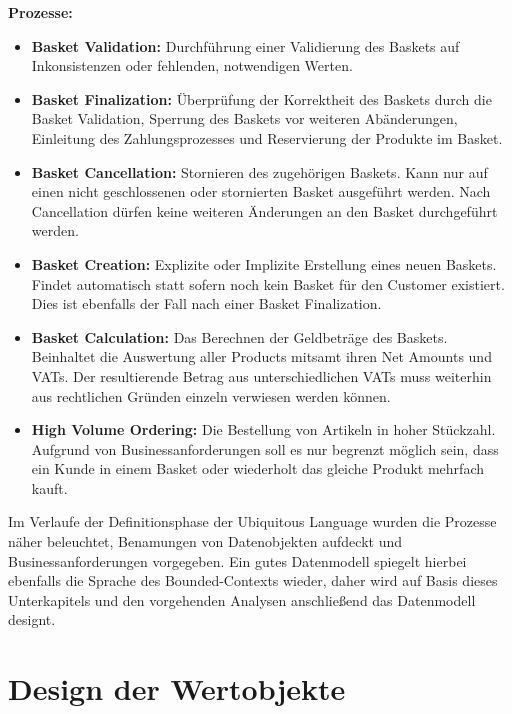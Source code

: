 {\large \textbf{Prozesse:}}
\begin{itemize}[noitemsep,nolistsep]
	\item \textbf{Basket Validation: } {Durchführung einer Validierung des Baskets auf Inkonsistenzen oder fehlenden, notwendigen Werten.}
	\item \textbf{Basket Finalization: } {Überprüfung der Korrektheit des Baskets durch die Basket Validation, Sperrung des Baskets vor weiteren Abänderungen, Einleitung des Zahlungsprozesses und Reservierung der Produkte im Basket. }
	\item \textbf{Basket Cancellation: } {Stornieren des zugehörigen Baskets. Kann nur auf einen nicht geschlossenen oder stornierten Basket ausgeführt werden. Nach Cancellation dürfen keine weiteren Änderungen an den Basket durchgeführt werden. }
	\item \textbf{Basket Creation: } {Explizite oder Implizite Erstellung eines neuen Baskets. Findet automatisch statt sofern noch kein Basket für den Customer existiert. Dies ist ebenfalls der Fall nach einer Basket Finalization.}
	\item \textbf{Basket Calculation: } {Das Berechnen der Geldbeträge des Baskets. Beinhaltet die Auswertung aller Products mitsamt ihren Net Amounts und VATs. Der resultierende Betrag aus unterschiedlichen VATs muss weiterhin aus rechtlichen Gründen einzeln verwiesen werden können.}
	\item \textbf{High Volume Ordering: } {Die Bestellung von Artikeln in hoher Stückzahl. Aufgrund von Businessanforderungen soll es nur begrenzt möglich sein, dass ein Kunde in einem Basket oder wiederholt das gleiche Produkt mehrfach kauft.}
\end{itemize}
\vspace{0.4em}


Im Verlaufe der Definitionsphase der Ubiquitous Language wurden die Prozesse näher beleuchtet, Benamungen von Datenobjekten aufdeckt und Businessanforderungen vorgegeben. Ein gutes Datenmodell spiegelt hierbei ebenfalls die Sprache des Bounded-Contexts wieder, daher wird auf Basis dieses Unterkapitels und den vorgehenden Analysen anschließend das Datenmodell designt. 

\section{Design der Wertobjekte}
\blindtext

